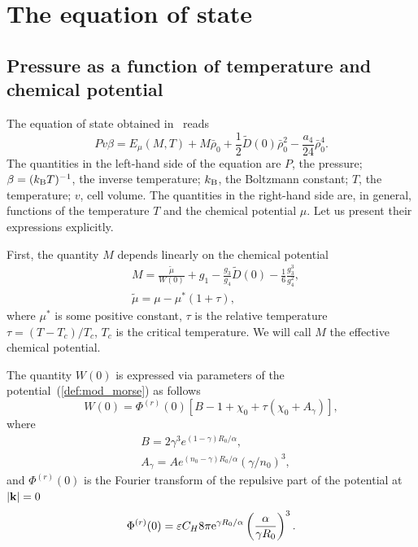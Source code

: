 \documentclass[12pt]{article}
\begin{document}
	\section{\label{sec:eos}The equation of state}
	\subsection{Pressure as a function of temperature and chemical potential}
	The equation of state obtained in~\cite[see Eq.(42)]{KozlovskiiDobush2020} reads
	\begin{equation}
		\label{eq:eosMT}
		Pv\beta = E_\mu(M, T) + M \bar \rho_0 + \frac{1}{2} \tilde D(0) \bar \rho_0^2 - \frac{a_4}{24} \bar \rho_0^4.
	\end{equation}
	The quantities in the left-hand side of the equation are $P$, the pressure; $\beta = (k_{\rm B} T)^{-1}$, the inverse temperature; $k_{\rm B}$, the Boltzmann constant; $T$, the temperature; $v$, cell volume. The quantities in the right-hand side are, in general, functions of the temperature $T$ and the chemical potential $\mu$. Let us present their expressions explicitly.
	
	First, the quantity $M$ depends linearly on the chemical potential
	\begin{align}\label{chem_pot}
		&	M = \frac{\tilde\mu}{W(0)} + g_1 - \frac{g_3}{g_4} \tilde D(0) - \frac{1}{6} \frac{g_3^3}{g_4^2}, \\
		&	\tilde\mu=\mu-\mu^*(1+\tau),
	\end{align}
	where $\mu^*$ is some positive constant, $\tau$ is the relative temperature $\tau = (T - T_c) / T_c$, $T_c$ is the critical temperature. We will call $M$ the effective chemical potential.
	
	The quantity $W(0)$ is expressed via parameters of the potential~(\ref{def:mod_morse}) as follows
	\begin{equation}
	W(0) = \Phi^{(r)}(0) \left[ B - 1 + \chi_0 + \tau (\chi_0 + A_\gamma) \right],
	\end{equation}
	where
	\begin{align*} 
		& B = 2 \gamma^3 e^{(1-\gamma)R_0/\alpha},
		\nonumber \\
		& A_\gamma = A e^{(n_0-\gamma)R_0/\alpha} \left( \gamma / n_0\right)^3, 
	\end{align*}
	and $\Phi^{(r)}(0)$ is the Fourier transform of the repulsive part of the potential at $\abs{\vb k}=0$
	\begin{equation*}
		\Phi^{(r)}(0) = \varepsilon C_H 8\pi {\rm e}^{\gamma R_0/\alpha} \left(\frac{\alpha}{\gamma R_0}\right)^3.
	\end{equation*}
	
\end{document}
